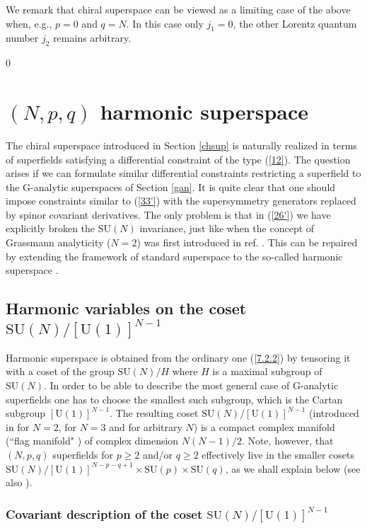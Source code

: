\documentclass[a4paper,12pt]{article}
\begin{document}
We remark that chiral superspace can be viewed as a limiting case 
of the above when, e.g., $p=0$ and $q=N$. In this case only 
$j_1=0$, the other Lorentz quantum number $j_2$ remains arbitrary. 

\setcounter{equation}0 
\section{$(N,p,q)$ harmonic superspace}\label{HSS}

The chiral superspace introduced in Section \ref{chsup} is 
naturally realized in terms of superfields satisfying a 
differential constraint of the type (\ref{12}). The question 
arises if we can formulate similar differential constraints 
restricting a superfield to the G-analytic superspaces of Section 
\ref{gan}. It is quite clear that one should impose constraints 
similar to (\ref{33'}) with the supersymmetry generators replaced 
by spinor covariant derivatives. The only problem is that in 
(\ref{26'}) we have explicitly broken the $\mbox{SU}(N)$ 
invariance, just like when the concept of Grassmann analyticity 
($N=2$) was first introduced in ref. \cite{GIO}. This can be 
repaired by extending the framework of standard superspace to the 
so-called harmonic superspace \cite{GIK1}. 

\subsection{Harmonic variables on the coset $\mbox{SU}(N)/[\mbox{U}(1)]^{N-1}$}

Harmonic superspace is obtained from the ordinary one 
(\ref{7.2.2}) by tensoring it with a coset of the group 
$\mbox{SU}(N)/H$ where $H$ is a maximal subgroup of 
$\mbox{SU}(N)$. In order to be able to describe the most general 
case of G-analytic superfields one has to choose the smallest 
such subgroup, which is the Cartan subgroup 
$[\mbox{U}(1)]^{N-1}$. The resulting coset 
$\mbox{SU}(N)/[\mbox{U}(1)]^{N-1}$ (introduced in \cite{GIK1} for 
$N=2$, \cite{GIK2} for $N=3$ and \cite{Bandos} for arbitrary $N$) 
is a compact complex manifold (``flag manifold" \cite{Knapp,hh}) 
of complex dimension $N(N-1)/2$. Note, however, that $(N,p,q)$ 
superfields for $p\geq 2$ and/or $q\geq 2$ effectively live in 
the smaller cosets $\mbox{SU}(N)/[\mbox{U}(1)]^{N-p-q+1}\times 
\mbox{SU}(p)\times \mbox{SU}(q)$, as we shall explain below (see 
also \cite{hh}). 

\subsubsection{Covariant description of the coset 
$\mbox{SU}(N)/[\mbox{U}(1)]^{N-1}$} 
\end{document}
